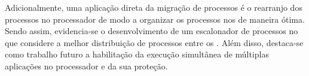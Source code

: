 Adicionalmente, uma aplicação direta da migração de processos é o rearranjo dos processos no processador de modo a organizar os processos nos \clusters de maneira ótima. Sendo assim, evidencia-se o desenvolvimento de um escalonador de processos no \nanvix que considere a melhor distribuição de processos entre os \clusters. Além disso, destaca-se como trabalho futuro a habilitação da execução simultânea de múltiplas aplicações no processador e da sua proteção. 
